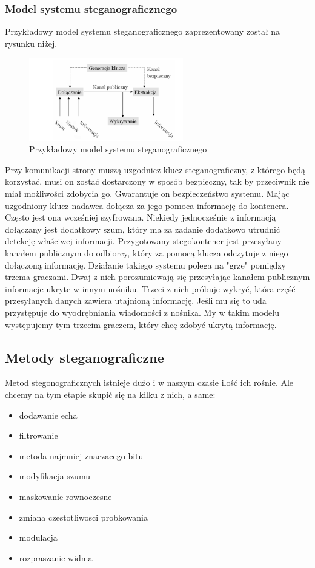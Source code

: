 \documentclass[a4paper,titleauthor]{mwart}
\begin{document}
\subsubsection{Model systemu steganograficznego}

Przykładowy model systemu steganograficznego zaprezentowany został na rysunku niżej.

  \begin{figure}[h]
	\centering
	\includegraphics[width=0.6\textwidth]{model}
	\caption{Przykładowy model systemu steganograficznego}
\end{figure}

Przy komunikacji strony muszą uzgodnicz klucz steganograficzny, z którego będą korzystać, musi on zostać dostarczony w sposób bezpieczny, tak by przeciwnik nie miał możliwości zdobycia go. Gwarantuje on bezpieczeństwo systemu. Mając uzgodniony klucz nadawca dołącza za jego pomoca informację do kontenera. Często jest ona wcześniej szyfrowana. Niekiedy jednocześnie z informacją dołączany jest dodatkowy szum, który ma za zadanie dodatkowo utrudnić detekcję właściwej informacji. Przygotowany stegokontener jest przesyłany kanałem publicznym do odbiorcy, który za pomocą klucza odczytuje z niego dołączoną informację. Działanie takiego systemu polega na "grze" pomiędzy trzema graczami. Dwaj z nich porozumiewają się przesyłając kanałem publicznym informacje ukryte w innym nośniku. Trzeci z nich próbuje wykryć, która część przesyłanych danych zawiera utajnioną informację. Jeśli mu się to uda przystępuje do wyodrębniania wiadomości z nośnika. My w takim modelu występujemy tym trzecim graczem, który chcę zdobyć ukrytą informację.

\subsection{Metody steganograficzne}

Metod stegonograficznych istnieje dużo i w naszym czasie ilość ich rośnie. Ale chcemy na tym etapie skupić się na kilku z nich, a same: \newline
\begin{itemize}
\item dodawanie echa
\item filtrowanie
\item metoda najmniej znaczacego bitu
\item modyfikacja szumu
\item maskowanie rownoczesne
\item zmiana czestotliwosci probkowania 
\item modulacja
\item rozpraszanie widma
\end{itemize}
\end{document}
